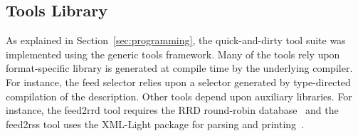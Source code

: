 \subsection{Tools Library}
As explained in Section~\ref{sec:programming},
the quick-and-dirty tool suite was implemented using the
generic tools framework.  Many of the tools rely upon
format-specific library is generated at compile time by the underlying
\padsml{} compiler.  For instance, the feed selector relies upon 
a selector generated by type-directed compilation of the \padsml{}
description.  Other tools depend upon auxiliary libraries.
For instance, the feed2rrd tool requires the RRD round-robin 
database~\cite{rrdtool}
and the feed2rss tool uses the XML-Light package for parsing
and printing~\cite{xmllight}.

